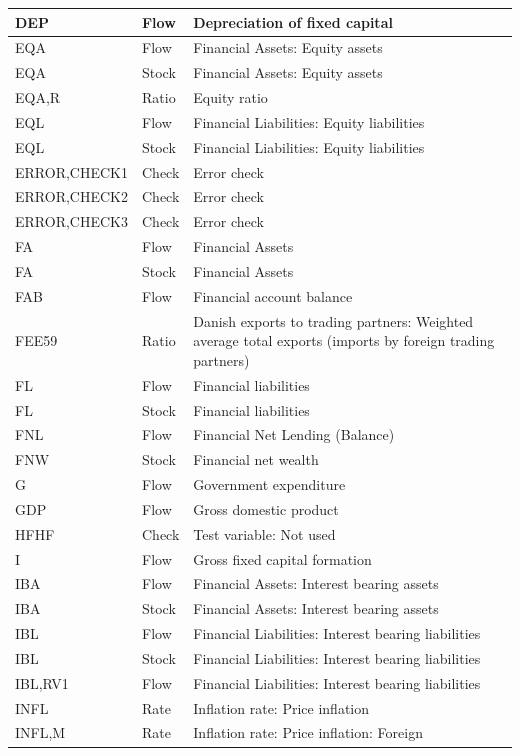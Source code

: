 \documentclass[
]{book}
\begin{document}
\begin{tabular}[t]{l|l|l}
\hline
DEP & Flow & Depreciation of fixed capital\\
\hline
EQA & Flow & Financial Assets: Equity assets\\
\hline
EQA & Stock & Financial Assets: Equity assets\\
\hline
EQA,R & Ratio & Equity ratio\\
\hline
EQL & Flow & Financial Liabilities: Equity liabilities\\
\hline
EQL & Stock & Financial Liabilities: Equity liabilities\\
\hline
ERROR,CHECK1 & Check & Error check\\
\hline
ERROR,CHECK2 & Check & Error check\\
\hline
ERROR,CHECK3 & Check & Error check\\
\hline
FA & Flow & Financial Assets\\
\hline
FA & Stock & Financial Assets\\
\hline
FAB & Flow & Financial account balance\\
\hline
FEE59 & Ratio & Danish exports to trading partners: Weighted average total exports (imports by foreign trading partners)\\
\hline
FL & Flow & Financial liabilities\\
\hline
FL & Stock & Financial liabilities\\
\hline
FNL & Flow & Financial Net Lending (Balance)\\
\hline
FNW & Stock & Financial net wealth\\
\hline
G & Flow & Government expenditure\\
\hline
GDP & Flow & Gross domestic product\\
\hline
HFHF & Check & Test variable: Not used\\
\hline
I & Flow & Gross fixed capital formation\\
\hline
IBA & Flow & Financial Assets: Interest bearing assets\\
\hline
IBA & Stock & Financial Assets: Interest bearing assets\\
\hline
IBL & Flow & Financial Liabilities: Interest bearing liabilities\\
\hline
IBL & Stock & Financial Liabilities: Interest bearing liabilities\\
\hline
IBL,RV1 & Flow & Financial Liabilities: Interest bearing liabilities\\
\hline
INFL & Rate & Inflation rate: Price inflation\\
\hline
INFL,M & Rate & Inflation rate: Price inflation: Foreign\\

\end{tabular}
\end{document}
